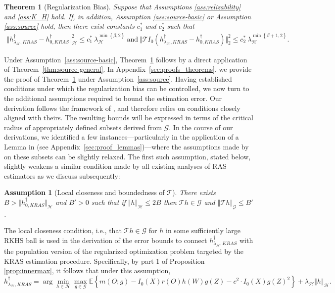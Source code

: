 \documentclass[twoside,11pt]{article}
\newtheorem{theorem}{Theorem}
\newtheorem{assumption}{Assumption}
\newcommand{\E}{\mathbb{E}}
\newcommand{\mc}{\mathcal}
\begin{document}
\begin{theorem}[Regularization Bias]
     Suppose that Assumptions \ref{ass:relizability} and \ref{ass:K_H} hold. If, in addition, Assumption \ref{ass:source-basic} or Assumption \ref{ass:source} hold, then there exist constants $c_1^*$ and $c_2^*$ such that 
    \begin{align*}
        \Vert  h_{\lambda_{\mc{H}},KRAS}^\dag - h_{0,KRAS}^\dag \Vert_{\mc{H}}^2 \le c_1^* \: \lambda_{\mc{H}}^{\min\left\{\beta,2\right\}} \:
        \text{and}\:
        \Vert \mc{T}I_0(h_{\lambda_{\mc{H}},KRAS}^\dag - h_{0,KRAS}^\dag )\Vert_2^2\le c_2^* \:\lambda_{\mc{H}}^{\min\left\{\beta+1,2\right\}}.
    \end{align*}
    \label{theo:biascontrol}
\end{theorem}

Under Assumption~\ref{ass:source-basic}, Theorem~\ref{theo:biascontrol} follows by a direct application of Theorem~\ref{thm:source-general}. In Appendix~\ref{sec:proofs_theorems}, we provide the proof of Theorem~\ref{theo:biascontrol} under Assumption~\ref{ass:source}. Having established conditions under which the regularization bias can be controlled, we now turn to the additional assumptions required to bound the estimation error. Our derivation follows the framework of \citet{bennett2023source}, and therefore relies on conditions closely aligned with theirs. The resulting bounds will be expressed in terms of the critical radius of appropriately defined subsets derived from $\mathcal{G}$. In the course of our derivations, we identified a few instances---particularly in the application of a Lemma in \citet{foster2023orthogonal} (see Appendix~\ref{sec:proof_lemmas})---where the assumptions made by \citet{bennett2023source} on these subsets can be slightly relaxed. The first such assumption, stated below, slightly weakens a similar condition made by all existing analyses of RAS estimators as we discuss subsequently:

 \begin{assumption}[Local closeness and boundedness of $\mc{T}$] There exists $B>\big\Vert h_{0,KRAS}^\dag\big\Vert_{\mc{H}}$ and $B'>0$ such that if $\Vert h\Vert_{\mc{H}}\le 2B$ then $\mc{T}h\in\mc{G}$ and $\left\Vert\mc{T}h\right\Vert_{\mc{G}}\le B'$.
\label{ass:closeness}
\end{assumption}

The local closeness condition, i.e., that $\mc{T}h\in\mc{G}$ for $h$ in some sufficiently large RKHS ball is used in the derivation of the error bounds to connect $h_{\lambda_{\mc{H}},KRAS}^\dag$ with the population version of the regularized optimization problem targeted by the KRAS estimation procedure. Specifically, by part 1 of Proposition \ref{prop:innermax}, it follows that under this assumption,
\begin{equation}      
h_{\lambda_{\mc{H}},KRAS}^\dag=\arg \min_{h\in\mc{H}}\max_{g\in\mc{G}}\E\left\{ m(O;g) -I_0(X)r(O)h(W)g(Z)-c^2\cdot I_0(X)g(Z)^2
\right\}+\lambda_{\mc{H}}\Vert h\Vert_{\mc{H}}.\label{eq:h_star}
        \end{equation}
   
\end{document}
